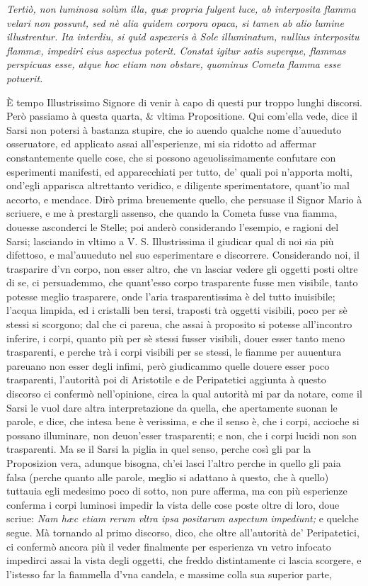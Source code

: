 \documentclass[11pt,twoside,openany]{book}
\begin{document}
\textit{Tertiò, non luminosa solùm illa, quæ propria fulgent luce, ab interposita flamma velari non possunt, sed nè alia quidem corpora opaca, si tamen ab alio lumine illustrentur. Ita interdiu, si quid aspexeris à Sole illuminatum, nullius interpositu flammæ, impediri eius aspectus poterit. Constat igitur satis superque, flammas perspicuas esse, atque hoc etiam non obstare, quominus Cometa flamma esse potuerit.}


È tempo Illustrissimo Signore di venir à capo di questi pur troppo lunghi discorsi. Però passiamo à questa quarta, \& vltima Propositione. Qui com'ella vede, dice il Sarsi non potersi à bastanza stupire, che io auendo qualche nome d'auueduto osseruatore, ed applicato assai all'esperienze, mi sia ridotto ad affermar constantemente quelle cose, che si possono ageuolissimamente confutare con esperimenti manifesti, ed apparecchiati per tutto, de' quali poi n'apporta molti, ond'egli apparisca altrettanto veridico, e diligente sperimentatore, quant'io mal accorto, e mendace. Dirò prima breuemente quello, che persuase il Signor Mario à scriuere, e me à prestargli assenso, che quando la Cometa fusse vna fiamma, douesse asconderci le Stelle; poi anderò considerando l'esempio, e ragioni del Sarsi; lasciando in vltimo a V. S. Illustrissima il giudicar qual di noi sia più difettoso, e mal'auueduto nel suo esperimentare e discorrere. Considerando noi, il trasparire d'vn corpo, non esser altro, che vn lasciar vedere gli oggetti posti oltre di se, ci persuademmo, che quant'esso corpo trasparente fusse men visibile, tanto potesse meglio trasparere, onde l'aria trasparentissima è del tutto inuisibile; l'acqua limpida, ed i cristalli ben tersi, traposti trà oggetti visibili, poco per sè stessi si scorgono; dal che ci pareua, che assai à proposito si potesse all'incontro inferire, i corpi, quanto più per sè stessi fusser visibili, douer esser tanto meno trasparenti, e perche trà i corpi visibili per se stessi, le fiamme per auuentura pareuano non esser degli infimi, però giudicammo quelle douere esser poco trasparenti, l'autorità poi di Aristotile e de Peripatetici aggiunta à questo discorso ci confermò nell'opinione, circa la qual autorità mi par da notare, come il Sarsi le vuol dare altra interpretazione da quella, che apertamente suonan le parole, e dice, che intesa bene è verissima, e che il senso è, che i corpi, accioche si possano illuminare, non deuon'esser trasparenti; e non, che i corpi lucidi non son trasparenti. Ma se il Sarsi la piglia in quel senso, perche così gli par la Proposizion vera, adunque bisogna, ch'ei lasci l'altro perche in quello gli paia falsa (perche quanto alle parole, meglio si adattano à questo, che à quello) tuttauia egli medesimo poco di sotto, non pure afferma, ma con più esperienze conferma i corpi luminosi impedir la vista delle cose poste oltre di loro, doue scriue: \textit{Nam hæc etiam rerum vltra ipsa positarum aspectum }\textit{impediunt}\textit{;} e quelche segue. Mà tornando al primo discorso, dico, che oltre all'autorità de' Peripatetici, ci confermò ancora più il veder finalmente per esperienza vn vetro infocato impedirci assai la vista degli oggetti, che freddo distintamente ci lascia scorgere, e l'istesso far la fiammella d'vna candela, e massime colla sua superior parte, 
\end{document}
